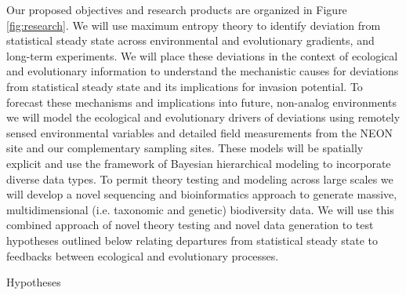 \documentclass[11pt]{article}
\makeatletter
\renewcommand{\paragraph}{\@startsection{paragraph}{4}{\z@}
  {1ex \@plus 1ex \@minus .2ex}{-1em}
  {\normalfont\normalsize\it}
}
\makeatother
\begin{document}
Our proposed objectives and research products are organized in Figure
\ref{fig:research}. We will use maximum entropy theory to identify
deviation from statistical steady state across environmental and
evolutionary gradients, and long-term experiments.  We will place
these deviations in the context of ecological and evolutionary
information to understand the mechanistic causes for deviations from
statistical steady state and its implications for invasion potential.
To forecast these mechanisms and implications into future, non-analog
environments we will model the ecological and evolutionary drivers of
deviations using remotely sensed environmental variables and detailed
field measurements from the NEON site and our complementary sampling
sites.  These models will be spatially explicit and use the framework
of Bayesian hierarchical modeling to incorporate diverse data types.
To permit theory testing and modeling across large scales we will
develop a novel sequencing and bioinformatics approach to generate
massive, multidimensional (i.e. taxonomic and genetic) biodiversity
data.  We will use this combined approach of novel theory testing and
novel data generation to test hypotheses outlined below relating
departures from statistical steady state to feedbacks between
ecological and evolutionary processes.

\paragraph{Hypotheses}
\end{document}
